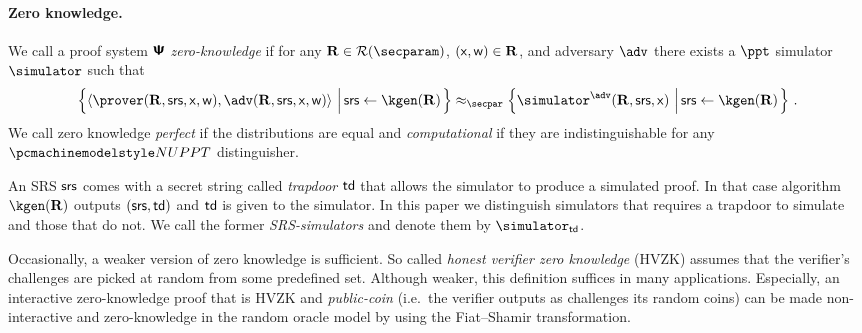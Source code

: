 \documentclass[runningheads,10pt]{llncs}
\begin{document}
 \paragraph{Zero knowledge.}
 We call a proof system $\bm{\mathsf{\Psi}}$ \emph{zero-knowledge} if for any
 $\REL \in \RELGEN(\secparam)$, $(\mathsf{x}, \mathsf{w}) \in \mathbf{R}$, and adversary $\adv$
 there exists a $\ppt$ simulator $\simulator$ such that
	\begin{multline*}
	  \left\{\ip{\prover(\REL, \srs, \inp, \wit)}{\adv(\REL, \srs, \inp, \wit)}
      \,\left|\, \srs \gets \kgen(\REL)\COMMENT{, (\inp, \wit) \gets \adv(\REL,
          \srs)}\vphantom{\simulator^\adv}\right.\right\} \approx_\secpar
		\left\{\simulator^{\adv}(\REL, \srs, \inp)\,\left|\, \srs \gets
        \kgen(\REL)\COMMENT{, (\inp, \wit) \gets \adv(\REL,
          \srs)}\vphantom{\simulator^\adv}\right.\right\}\,.
\end{multline*}
We call zero knowledge \emph{perfect} if the distributions are equal and
\emph{computational} if they are indistinguishable for any $\nuppt$
distinguisher.

An SRS $\mathsf{srs}$ comes with a secret string called \emph{trapdoor} $\mathsf{td}$ that
allows the simulator to produce a simulated proof. In that case algorithm
$\kgen(\REL)$ outputs $(\mathsf{srs}, \mathsf{td})$ and $\mathsf{td}$ is given to the simulator. In this
paper we distinguish simulators that requires a trapdoor to simulate and those
that do not. We call the former \emph{SRS-simulators} and denote them by
$\simulator_\td$.

Occasionally, a weaker version of zero knowledge is sufficient. So called
\emph{honest verifier zero knowledge} (HVZK) assumes that the verifier's
challenges are picked at random from some predefined set. Although weaker, this
definition suffices in many applications. Especially, an interactive
zero-knowledge proof that is HVZK and \emph{public-coin} (i.e.~the verifier
outputs as challenges its random coins) can be made non-interactive and
zero-knowledge in the random oracle model by using the Fiat--Shamir
transformation.
\end{document}
